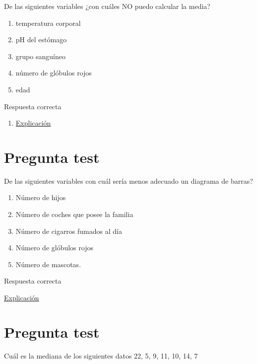 \documentclass[
]{book}
\providecommand{\tightlist}{%
  \setlength{\itemsep}{0pt}\setlength{\parskip}{0pt}}
\begin{document}
De las siguientes variables ¿con cuáles NO puedo calcular la media?

\begin{enumerate}
\def\labelenumi{\alph{enumi})}
\tightlist
\item
  temperatura corporal
\item
  pH del estómago
\item
  grupo sanguíneo
\item
  número de glóbulos rojos
\item
  edad
\end{enumerate}

Respuesta correcta

\begin{enumerate}
\def\labelenumi{\alph{enumi})}
\setcounter{enumi}{2}
\tightlist
\item
  \href{https://1fjmanzano.github.io/bioestadistica/tipos-de-variables.html}{Explicación}
\end{enumerate}

\hypertarget{pregunta-test-88}{%
\section{Pregunta test}\label{pregunta-test-88}}

De las siguientes variables con cuál sería menos adecuado un diagrama de barras?

\begin{enumerate}
\def\labelenumi{\alph{enumi})}
\tightlist
\item
  Número de hijos
\item
  Número de coches que posee la familia
\item
  Número de cigarros fumados al día
\item
  Número de glóbulos rojos
\item
  Número de mascotas.
\end{enumerate}

Respuesta correcta

\href{https://1fjmanzano.github.io/bioestadistica/representaciones-gra\%CC\%81ficas.html}{Explicación}

\hypertarget{pregunta-test-89}{%
\section{Pregunta test}\label{pregunta-test-89}}

Cuál es la mediana de los siguientes datos 22, 5, 9, 11, 10, 14, 7
\end{document}
